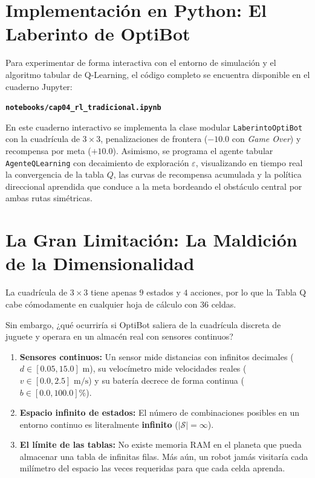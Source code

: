 \section{Implementación en Python: El Laberinto de OptiBot}
Para experimentar de forma interactiva con el entorno de simulación y el algoritmo tabular de Q-Learning, el código completo se encuentra disponible en el cuaderno Jupyter:
\begin{center}
  \textbf{\texttt{notebooks/cap04\_rl\_tradicional.ipynb}}
\end{center}
En este cuaderno interactivo se implementa la clase modular \texttt{LaberintoOptiBot} con la cuadrícula de $3 \times 3$, penalizaciones de frontera ($-10.0$ con \textit{Game Over}) y recompensa por meta ($+10.0$). Asimismo, se programa el agente tabular \texttt{AgenteQLearning} con decaimiento de exploración $\varepsilon$, visualizando en tiempo real la convergencia de la tabla $Q$, las curvas de recompensa acumulada y la política direccional aprendida que conduce a la meta bordeando el obstáculo central por ambas rutas simétricas.

\section{La Gran Limitación: La Maldición de la Dimensionalidad}
La cuadrícula de $3 \times 3$ tiene apenas $9$ estados y $4$ acciones, por lo que la Tabla Q cabe cómodamente en cualquier hoja de cálculo con $36$ celdas.

Sin embargo, ¿qué ocurriría si OptiBot saliera de la cuadrícula discreta de juguete y operara en un almacén real con sensores continuos?
\begin{enumerate}
  \item \textbf{Sensores continuos:} Un sensor mide distancias con infinitos decimales ($d \in [0.05, 15.0]\text{ m}$), su velocímetro mide velocidades reales ($v \in [0.0, 2.5]\text{ m/s}$) y su batería decrece de forma continua ($b \in [0.0, 100.0]\%$).
  \item \textbf{Espacio infinito de estados:} El número de combinaciones posibles en un entorno continuo es literalmente \textbf{infinito} ($|\mathcal{S}| = \infty$).
  \item \textbf{El límite de las tablas:} No existe memoria RAM en el planeta que pueda almacenar una tabla de infinitas filas. Más aún, un robot jamás visitaría cada milímetro del espacio las veces requeridas para que cada celda aprenda.
\end{enumerate}


